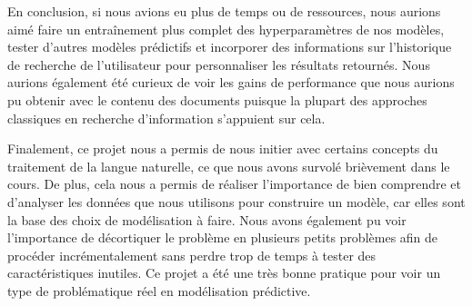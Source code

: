 En conclusion, si nous avions eu plus de temps ou de ressources, nous aurions aimé faire un entraînement plus complet des hyperparamètres de nos modèles, tester d'autres modèles prédictifs et incorporer des informations sur l'historique de recherche de l'utilisateur pour personnaliser les résultats retournés.
Nous aurions également été curieux de voir les gains de performance que nous aurions pu obtenir avec le contenu des documents puisque la plupart des approches classiques en recherche d'information s'appuient sur cela.


Finalement, ce projet nous a permis de nous initier avec certains concepts du traitement de la langue naturelle, ce que nous avons survolé brièvement dans le cours. De plus, cela nous a permis de réaliser l'importance de bien comprendre et d'analyser les données que nous utilisons pour construire un modèle, car elles sont la base des choix de modélisation à faire. Nous avons également pu voir l'importance de décortiquer le problème en plusieurs petits problèmes afin de procéder incrémentalement sans perdre trop de temps à tester des caractéristiques inutiles. Ce projet a été une très bonne pratique pour voir un type de problématique réel en modélisation prédictive.
